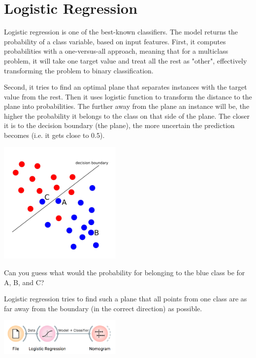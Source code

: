 \chapter{Logistic Regression}
\label{ch:logistic_regression}

Logistic regression is one of the best-known classifiers. The model returns the probability of a class variable, based on input features. First, it computes probabilities with a one-versus-all approach, meaning that for a multiclass problem, it will take one target value and treat all the rest as "other", effectively transforming the problem to binary classification.

Second, it tries to find an optimal plane that separates instances with the target value from the rest. Then it uses logistic function to transform the distance to the plane into probabilities. The further away from the plane an instance will be, the higher the probability it belongs to the class on that side of the plane. The closer it is to the decision boundary (the plane), the more uncertain the prediction becomes (i.e. it gets close to 0.5).

\begin{marginfigure}
    \includegraphics[width=60mm]{logistic-regression.png}%
    \caption{Can you guess what would the probability for belonging to the blue class be for A, B, and C?}
    \label{fig:logreg}
  \end{marginfigure}

Logistic regression tries to find such a plane that all points from one class are as far away from the boundary (in the correct direction) as possible.

\begin{marginfigure}
    \includegraphics[width=60mm]{workflow.png}%
    \label{fig:workflow}
  \end{marginfigure}


